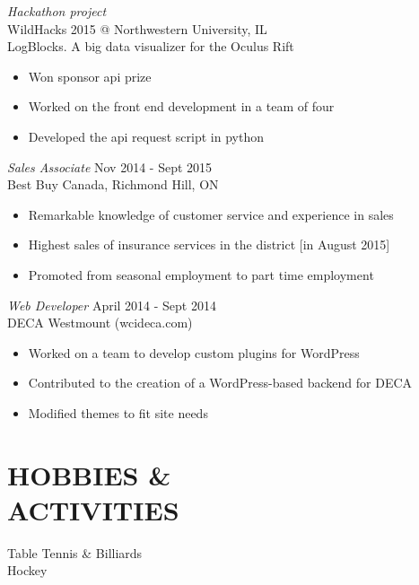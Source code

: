 \documentclass[margin]{res}
\begin{document}
\begin{resume}
                {\sl Hackathon project} \\
                WildHacks 2015 @ Northwestern University, IL \\
				LogBlocks. A big data visualizer for the Oculus Rift 
				\begin {itemize} \itemsep -2pt
				\item Won sponsor api prize
				\item Worked on the front end development in a team of four
				\item Developed the api request script in python
				
				\end {itemize}

 
                {\sl Sales Associate} \hfill            Nov 2014 - Sept 2015 \\
                Best Buy Canada, Richmond Hill, ON
                 \begin{itemize}  \itemsep -2pt %
                 \item Remarkable knowledge of customer service and experience in sales
                 \item Highest sales of insurance services in the district [in August 2015]
                 \item Promoted from seasonal employment to part time employment
                 \end{itemize} 
                {\sl Web Developer} \hfill        April 2014 - Sept 2014 \\
                DECA Westmount (wcideca.com)
                  \begin{itemize} \itemsep -2pt
                   \item Worked on a team to develop custom plugins for WordPress
                   \item Contributed to the creation of a WordPress-based backend for DECA
                   \item Modified themes to fit site needs 
                   \end{itemize} 
                  


\section{HOBBIES \& \\ ACTIVITIES}             
 			Table Tennis \& Billiards \\
 			Hockey 
 			\

\end{resume}
\end{document}
